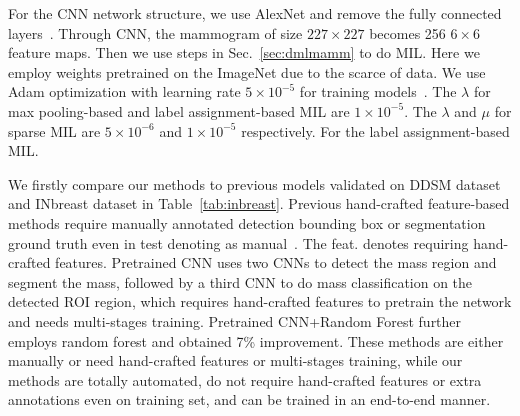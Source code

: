 \documentclass[runningheads,a4paper]{llncs}
\begin{document}
For the CNN network structure, we use AlexNet and remove the fully connected layers~\cite{krizhevsky2012imagenet}. Through CNN, the mammogram of size $227 \times 227$ becomes 256 $6 \times 6$ feature maps. Then we use steps in Sec.~\ref{sec:dmlmamm} to do MIL. Here we employ weights pretrained on the ImageNet due to the scarce of data. We use Adam optimization with learning rate $5 \times 10^{-5}$ for training models~\cite{ba2015adam}. The $\lambda$ for max pooling-based and label assignment-based MIL are $1 \times 10^{-5}$. The $\lambda$ and $\mu$ for sparse MIL are $5 \times 10^{-6}$ and $1 \times 10^{-5}$ respectively. For the label assignment-based MIL.%

We firstly compare our methods to previous models validated on DDSM dataset and INbreast dataset in Table~\ref{tab:inbreast}. Previous hand-crafted feature-based methods require manually annotated detection bounding box or segmentation ground truth even in test denoting as manual~\cite{ball2007digital,varela2006use,domingues2012inbreast}. The feat. denotes requiring hand-crafted features. Pretrained CNN uses two CNNs to detect the mass region and segment the mass, followed by a third CNN to do  mass classification on the detected ROI region, which requires hand-crafted features to pretrain the network and needs multi-stages training\cite{dhungel2016automated}. Pretrained CNN+Random Forest further employs random forest and obtained 7\% improvement. These methods are either manually or need hand-crafted features or multi-stages training, while our methods are totally automated, do not require hand-crafted features or extra annotations even on training set, and can be trained in an end-to-end manner.
\end{document}
